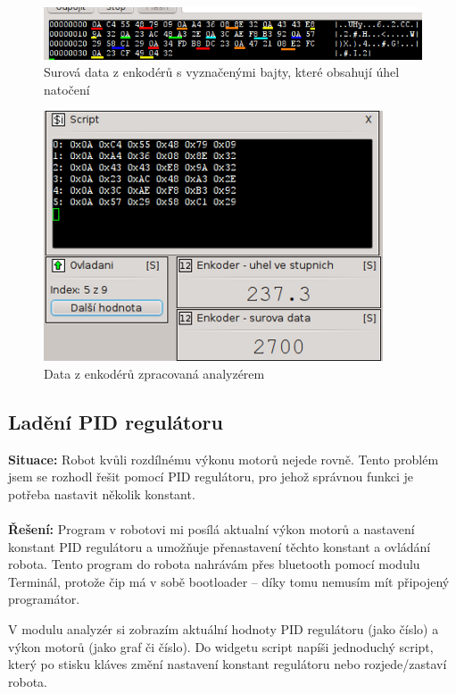 \documentclass[12pt, a4paper, oneside]{article}
\begin{document}
\begin{figure}[H]
\begin{center}
\includegraphics{img/use_enc_term.png}
\caption{Surová data z enkodérů s vyznačenými bajty, které obsahují úhel natočení}
\label{Terminal}
\end{center}
\end{figure}

\begin{figure}[H]
\begin{center}
\includegraphics{img/use_enc_analyzer.png}
\caption{Data z enkodérů zpracovaná analyzérem}
\label{Terminal}
\end{center}
\end{figure}

\newpage
\subsection{Ladění PID regulátoru}
{\bf Situace:} Robot kvůli rozdílnému výkonu motorů nejede rovně. Tento problém jsem se rozhodl řešit pomocí PID regulátoru, pro jehož správnou funkci je potřeba nastavit několik konstant. \\
\\
{\bf Řešení:} Program v robotovi mi posílá aktualní výkon motorů a nastavení konstant PID regulátoru a umožňuje přenastavení těchto konstant a ovládání robota. Tento program do robota nahrávám přes bluetooth pomocí modulu Terminál, protože čip má v sobě bootloader -- díky tomu nemusím mít připojený programátor.  

V modulu analyzér si zobrazím aktuální hodnoty PID regulátoru (jako číslo) a výkon motorů (jako graf či číslo). Do widgetu script napíši jednoduchý script, který po stisku kláves změní nastavení konstant regulátoru nebo rozjede/zastaví robota.
\end{document}
